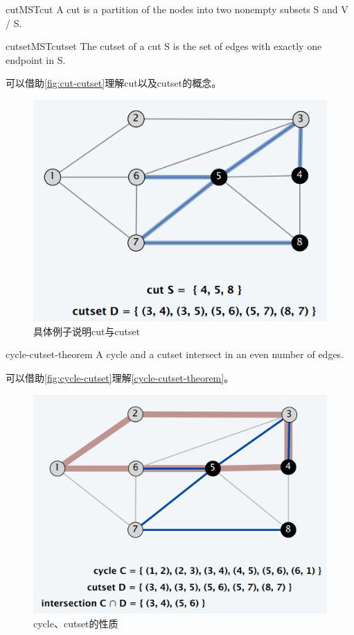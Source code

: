 \begin{definition}{cut}{MSTcut}
	A cut is a partition of the nodes into two nonempty subsets S and V / S.
\end{definition}

\begin{definition}{cutset}{MSTcutset}
	The cutset of a cut S is the set of edges with exactly one endpoint in S.
\end{definition}

可以借助\autoref{fig:cut-cutset}理解cut以及cutset的概念。

\begin{figure}[hbt]
	\centering
	\includegraphics[scale=0.5]{image/cutcutset.png}
	\caption{具体例子说明cut与cutset}\label{fig:cut-cutset}
\end{figure}

\begin{theorem}{}{cycle-cutset-theorem}
	A cycle and a cutset intersect in an even number of edges.
\end{theorem}

可以借助\autoref{fig:cycle-cutset}理解\autoref{cycle-cutset-theorem}。

\begin{figure}[hbt]
	\centering
	\includegraphics[scale=0.5]{image/cyclecutset.png}
	\caption{cycle、cutset的性质}\label{fig:cycle-cutset}
\end{figure}

